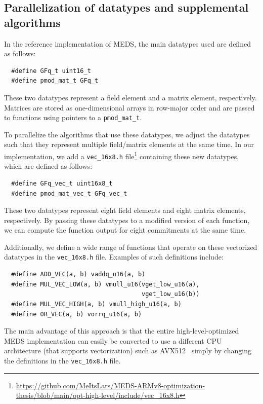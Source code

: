\documentclass[11pt,a4paper]{report}
\theoremstyle{definition}
\begin{document}
\subsection{Parallelization of datatypes and supplemental algorithms}
\label{sec:highleveldataalgorithms}
In the reference implementation of MEDS, the main datatypes used are defined as follows:
\begin{samepage}
  \begin{verbatim}
  #define GFq_t uint16_t
  #define pmod_mat_t GFq_t
\end{verbatim}
\end{samepage}
These two datatypes represent a field element and a matrix element, respectively. Matrices are stored as one-dimensional arrays in row-major order and are passed to functions using pointers to a \texttt{pmod\_mat\_t}.

To parallelize the algorithms that use these datatypes, we adjust the datatypes such that they represent multiple field/matrix elements at the same time. In our implementation, we add a \texttt{vec\_16x8.h} file\footnote{\url{https://github.com/MeItsLars/MEDS-ARMv8-optimization-thesis/blob/main/opt-high-level/include/vec\_16x8.h}} containing these new datatypes, which are defined as follows:
\begin{samepage}
  \begin{verbatim}
  #define GFq_vec_t uint16x8_t
  #define pmod_mat_vec_t GFq_vec_t
\end{verbatim}
\end{samepage}
These two datatypes represent eight field elements and eight matrix elements, respectively. By passing these datatypes to a modified version of each function, we can compute the function output for eight commitments at the same time.

Additionally, we define a wide range of functions that operate on these vectorized datatypes in the \texttt{vec\_16x8.h} file. Examples of such definitions include:
\begin{samepage}
  \begin{verbatim}
  #define ADD_VEC(a, b) vaddq_u16(a, b)
  #define MUL_VEC_LOW(a, b) vmull_u16(vget_low_u16(a), 
                                      vget_low_u16(b))
  #define MUL_VEC_HIGH(a, b) vmull_high_u16(a, b)
  #define OR_VEC(a, b) vorrq_u16(a, b)
\end{verbatim}
\end{samepage}
The main advantage of this approach is that the entire high-level-optimized MEDS implementation can easily be converted to use a different CPU architecture (that supports vectorization) such as AVX512~\cite{intel-avx512} simply by changing the definitions in the \texttt{vec\_16x8.h} file.
\end{document}
